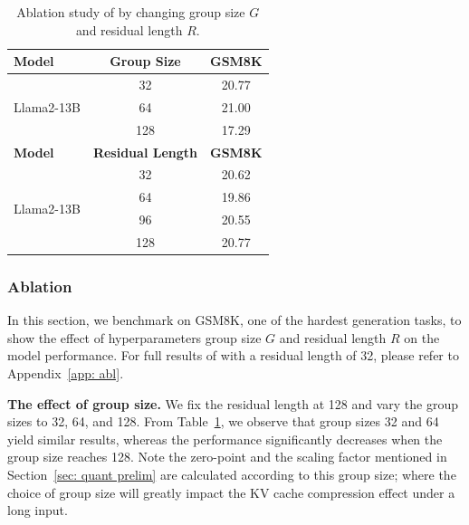 \begin{table}
\centering
\small
\caption{Ablation study of \kivi{} by changing group size $G$ and residual length $R$.}
\label{tab:abl}
\begin{tabular}{lcc} 
\toprule
\textbf{Model}                         & \textbf{Group Size} & \textbf{GSM8K}  \\ 
\midrule
\multirow{3}{*}{Llama2-13B}  & 32  & 20.77 \\
                            & 64  & 21.00 \\
                            & 128 & 17.29\\
\bottomrule
\toprule
\textbf{Model}                         & \textbf{Residual Length} & \textbf{GSM8K}  \\ 
\midrule
 \multirow{4}{*}{Llama2-13B}                            & 32  & 20.62 \\
                             & 64  & 19.86 \\
                             & 96  & 20.55\\
                             & 128 & 20.77\\
\bottomrule
\end{tabular}
\vspace{-1.5em}
\end{table} 

\subsubsection{Ablation}

In this section, we benchmark \kivi{} on GSM8K, one of the hardest generation tasks, to show the effect of hyperparameters group size $G$ and residual length $R$ on the model performance. For full results of \kivi{} with a residual length of 32, please refer to Appendix~\ref{app: abl}.

\textbf{The effect of group size.} We fix the residual length at 128 and vary the group sizes to 32, 64, and 128. From Table~\ref{tab:abl}, we observe that group sizes 32 and 64 yield similar results, whereas the performance significantly decreases when the group size reaches 128. Note the zero-point and the scaling factor mentioned in Section~\ref{sec: quant prelim} are calculated according to this group size; where the choice of group size will greatly impact the KV cache compression effect under a long input.

